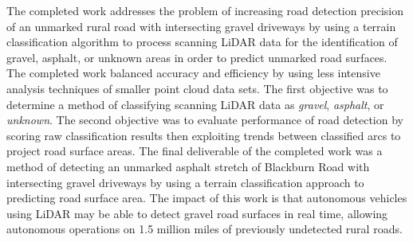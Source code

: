 \documentclass[numbered,pdftex]{ohio-etd}
\begin{document}
{	{The completed work addresses the problem of increasing road detection precision of an unmarked rural road with intersecting gravel driveways by using a terrain classification algorithm to process scanning LiDAR data for the identification of gravel, asphalt, or unknown areas in order to predict unmarked road surfaces. The completed work balanced accuracy and efficiency by using less intensive analysis techniques of smaller point cloud data sets. The first objective was to determine a method of classifying scanning LiDAR data as \textit{gravel}, \textit{asphalt}, or \textit{unknown}. The second objective was to evaluate performance of road detection by scoring raw classification results then exploiting trends between classified arcs to project road surface areas. The final deliverable of the completed work was a method of detecting an unmarked asphalt stretch of Blackburn Road with intersecting gravel driveways by using a terrain classification approach to predicting road surface area. The impact of this work is that autonomous vehicles using LiDAR may be able to detect gravel road surfaces in real time, allowing autonomous operations on 1.5 million miles of previously undetected rural roads.}
	
}



%
%	
%	
%	
%	
%	
		
%			
%			
%			
%			
%				
		
\end{document}

